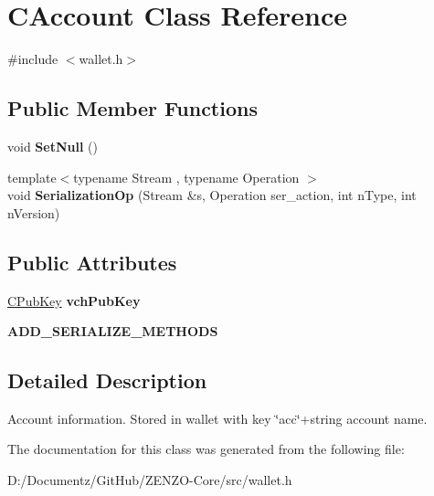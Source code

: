 \hypertarget{class_c_account}{}\section{C\+Account Class Reference}
\label{class_c_account}


{\ttfamily \#include $<$wallet.\+h$>$}

\subsection*{Public Member Functions}
\begin{DoxyCompactItemize}
\item 
\mbox{\label{class_c_account_ac63a4127fd899a21a5916a86588e809a}} 
void {\bfseries Set\+Null} ()
\item 
\mbox{\label{class_c_account_a645167419dead15544700e6ab2280a10}} 
{\footnotesize template$<$typename Stream , typename Operation $>$ }\\void {\bfseries Serialization\+Op} (Stream \&s, Operation ser\+\_\+action, int n\+Type, int n\+Version)
\end{DoxyCompactItemize}
\subsection*{Public Attributes}
\begin{DoxyCompactItemize}
\item 
\mbox{\label{class_c_account_a8bc9b476371009c12a6c25d4c7264de5}} 
\mbox{\hyperlink{class_c_pub_key}{C\+Pub\+Key}} {\bfseries vch\+Pub\+Key}
\item 
\mbox{\label{class_c_account_ad1054a718063912b1c5e1103eaa005cc}} 
{\bfseries A\+D\+D\+\_\+\+S\+E\+R\+I\+A\+L\+I\+Z\+E\+\_\+\+M\+E\+T\+H\+O\+DS}
\end{DoxyCompactItemize}


\subsection{Detailed Description}
Account information. Stored in wallet with key \char`\"{}acc\char`\"{}+string account name. 

The documentation for this class was generated from the following file\+:\begin{DoxyCompactItemize}
\item 
D\+:/\+Documentz/\+Git\+Hub/\+Z\+E\+N\+Z\+O-\/\+Core/src/wallet.\+h\end{DoxyCompactItemize}
